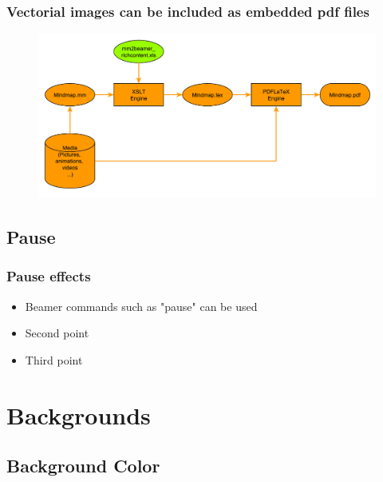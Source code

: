 \documentclass[usepdftitle=false,professionalfonts,compress ]{beamer}
\begin{document}
{
\begin{frame}\frametitle{Vectorial images can be included as embedded pdf files}

\begin{figure}
	\includegraphics[width=.97\textwidth]{diagram.pdf}\end{figure}
\end{frame}
}



\subsection{Pause}

{
\begin{frame}\frametitle{Pause effects}


	\begin{itemize}

	\item Beamer commands such as "pause" can be used \pause

			\item Second point \pause

			\item     Third point

				\end{itemize}

\end{frame}
}






\section{Backgrounds}
		
\subsection{Background Color}
\end{document}
